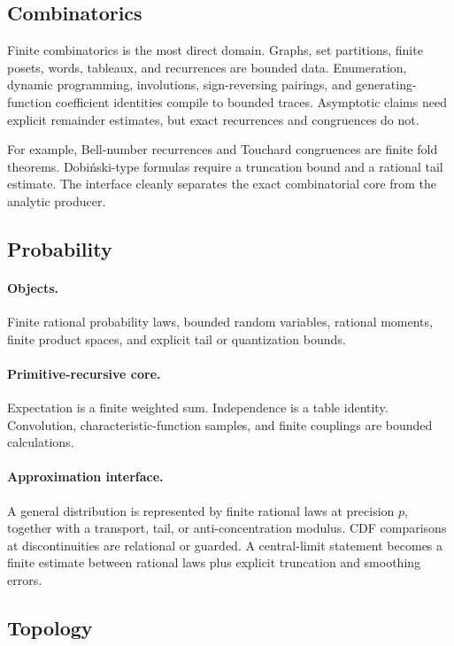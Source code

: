 \subsection{Combinatorics}

Finite combinatorics is the most direct domain.  Graphs, set partitions,
finite posets, words, tableaux, and recurrences are bounded data.  Enumeration,
dynamic programming, involutions, sign-reversing pairings, and generating-
function coefficient identities compile to bounded traces.  Asymptotic claims
need explicit remainder estimates, but exact recurrences and congruences do
not.

For example, Bell-number recurrences and Touchard congruences are finite fold
theorems.  Dobi\'nski-type formulas require a truncation bound and a rational
tail estimate.  The interface cleanly separates the exact combinatorial core
from the analytic producer.

\subsection{Probability}

\paragraph{Objects.}
Finite rational probability laws, bounded random variables, rational moments,
finite product spaces, and explicit tail or quantization bounds.

\paragraph{Primitive-recursive core.}
Expectation is a finite weighted sum.  Independence is a table identity.
Convolution, characteristic-function samples, and finite couplings are
bounded calculations.

\paragraph{Approximation interface.}
A general distribution is represented by finite rational laws at precision
\(p\), together with a transport, tail, or anti-concentration modulus.  CDF
comparisons at discontinuities are relational or guarded.  A central-limit
statement becomes a finite estimate between rational laws plus explicit
truncation and smoothing errors.

\subsection{Topology}


